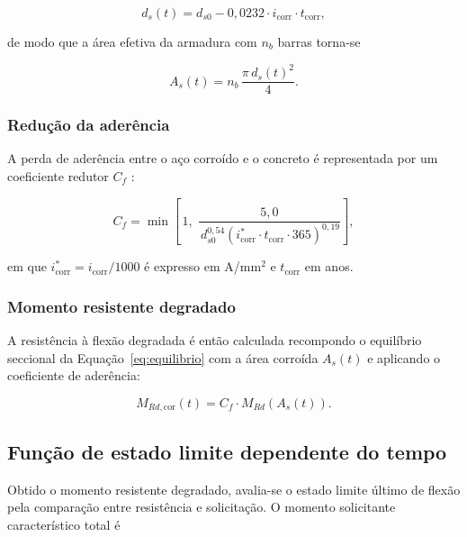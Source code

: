 \begin{equation}\label{eq:d_cor}
d_{s}(t) = d_{s0} - 0{,}0232 \cdot i_{\mathrm{corr}} \cdot t_{\mathrm{corr}},
\end{equation}

\noindent de modo que a área efetiva da armadura com $n_b$ barras torna-se

\begin{equation}\label{eq:as_t}
A_{s}(t) = n_b\, \frac{\pi\, d_{s}(t)^2}{4}.
\end{equation}

\subsubsection{Redução da aderência}

A perda de aderência entre o aço corroído e o concreto é representada por um coeficiente redutor $C_f$ \citep{azad2010}:

\begin{equation}\label{eq:c_f}
C_f = \min\!\left[\,1,\; \frac{5{,}0}{\, d_{s0}^{0{,}54} \left( i^{*}_{\mathrm{corr}} \cdot t_{\mathrm{corr}} \cdot 365 \right)^{0{,}19}}\right],
\end{equation}

\noindent em que $i^{*}_{\mathrm{corr}} = i_{\mathrm{corr}}/1000$ é expresso em A/mm$^2$ e $t_{\mathrm{corr}}$ em anos.

\subsubsection{Momento resistente degradado}

A resistência à flexão degradada é então calculada recompondo o equilíbrio seccional da Equação~\eqref{eq:equilibrio} com a área corroída $A_s(t)$ e aplicando o coeficiente de aderência:

\begin{equation}\label{eq:m_res}
M_{Rd,\mathrm{cor}}(t) = C_f \cdot M_{Rd}\!\left(A_{s}(t)\right).
\end{equation}

\subsection{Função de estado limite dependente do tempo}
\label{subsec:funcao_g}

Obtido o momento resistente degradado, avalia-se o estado limite último de flexão pela comparação entre resistência e solicitação. O momento solicitante característico total é


